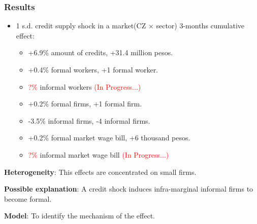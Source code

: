 \documentclass[aspectratio=169]{beamer} %
\begin{document}
\begin{frame}
\frametitle{\textbf{Results}}

\begin{itemize}
    \item 1 s.d. credit supply shock in a market(CZ $\times$ sector) 3-months cumulative effect:
    \begin{itemize}
        \item +6.9\% amount of credits, +31.4 million pesos.
        \item +0.4\% formal workers, +1 formal worker.
        \item \textcolor{red}{?\%} informal workers \textcolor{red}{(In Progress...)}
        \item +0.2\% formal firms, +1 formal firm.
        \item -3.5\% informal firms, -4 informal firms.
        \item +0.2\% formal market wage bill, +6 thousand pesos.
        \item \textcolor{red}{?\%} informal market wage bill \textcolor{red}{(In Progress...)}
    \end{itemize}
\end{itemize}

\vspace{5mm}

\textbf{Heterogeneity}: This effects are concentrated on small firms.

\vspace{5mm}

\textbf{Possible explanation}: A credit shock induces infra-marginal informal firms to become formal.

\vspace{5mm}

\textbf{Model}: To identify the mechanism of the effect. 

\end{frame}

\end{document}
